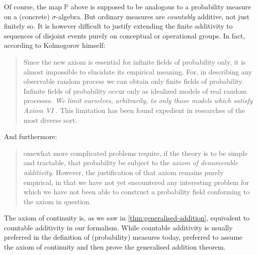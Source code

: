 \documentclass[article, a4paper, 11pt, oneside]{memoir}
\numberwithin{equation}{chapter}
\renewcommand{\P}{\mathbb{P}}
\begin{document}
Of course, the map $\P$ above is supposed to be analogous to a probability measure on a (concrete) $\sigma$-algebra. But ordinary measures are \emph{countably} additive, not just finitely so. It is however difficult to justify extending the finite additivity to sequences of disjoint events purely on conceptual or operational groups. In fact, according to Kolmogorov himself:
%
\blockquote[\cite{kolmogorov1956}]{%
    Since the new axiom  is essential for infinite fields of probability only, it is almost impossible to elucidate its empirical meaning. \textelp{} For, in describing any observable random process we can obtain only finite fields of probability. Infinite fields of probability occur only as idealized models of real random processes. \emph{We limit ourselves, arbitrarily, to only those models which satisfy Axiom VI} . This limitation has been found expedient in researches of the most diverse sort.%
}
%
And furthermore:
%
\blockquote[\cite{kolmogorov1995}]{%
    omewhat more complicated problems require, if the theory is to be simple and tractable, that probability be subject to the \emph{axiom of denumerable additivity}. However, the justification of that axiom remains purely empirical, in that we have not yet encountered any interesting problem for which we have not been able to construct a probability field conforming to the axiom in question.%
}
%
The axiom of continuity is, as we saw in \cref{thm:generalised-addition}, equivalent to countable additivity in our formalism. While countable additivity is usually preferred in the definition of (probability) measures today, \textcite{kolmogorov1956} preferred to assume the axiom of continuity and then prove the generalised addition theorem.


\nocite{*}

\printbibliography
\end{document}
